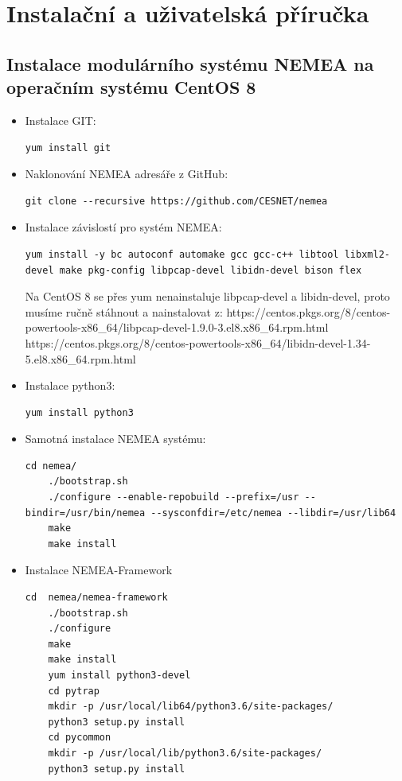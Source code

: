 \documentclass[thesis=B,czech,hidelinks]{FITthesis}[2019/03/21]
\begin{document}
\chapter{Instalační a uživatelská příručka}
\section{Instalace modulárního systému NEMEA na operačním systému CentOS 8}
\begin{itemize}
    \item Instalace GIT:
    \begin{lstlisting}[style=example]
    yum install git
    \end{lstlisting}
    \item Naklonování NEMEA adresáře z GitHub:
    \begin{lstlisting}[style=example]
    git clone --recursive https://github.com/CESNET/nemea
    \end{lstlisting}
    \item Instalace závislostí pro systém NEMEA:
    \begin{lstlisting}[style=example]
    yum install -y bc autoconf automake gcc gcc-c++ libtool libxml2-devel make pkg-config libpcap-devel libidn-devel bison flex
    \end{lstlisting}
    \subitem Na CentOS 8 se přes yum nenainstaluje libpcap-devel a libidn-devel, proto musíme ručně stáhnout a nainstalovat z:
    \subsubitem https://centos.pkgs.org/8/centos-powertools-x86\_64/libpcap-devel-1.9.0-3.el8.x86\_64.rpm.html
    \subsubitem https://centos.pkgs.org/8/centos-powertools-x86\_64/libidn-devel-1.34-5.el8.x86\_64.rpm.html
    \item Instalace python3:
    \begin{lstlisting}[style=example]
    yum install python3
    \end{lstlisting}
    \item Samotná instalace NEMEA systému:
    \begin{lstlisting}[style=example]
    cd nemea/
    ./bootstrap.sh
    ./configure --enable-repobuild --prefix=/usr --bindir=/usr/bin/nemea --sysconfdir=/etc/nemea --libdir=/usr/lib64
    make
    make install
    \end{lstlisting}
    \item Instalace NEMEA-Framework
    \begin{lstlisting}[style=example]
    cd  nemea/nemea-framework
    ./bootstrap.sh
    ./configure
    make
    make install
    yum install python3-devel
    cd pytrap
    mkdir -p /usr/local/lib64/python3.6/site-packages/
    python3 setup.py install
    cd pycommon
    mkdir -p /usr/local/lib/python3.6/site-packages/
    python3 setup.py install
    \end{lstlisting}
\end{itemize}
\end{document}
